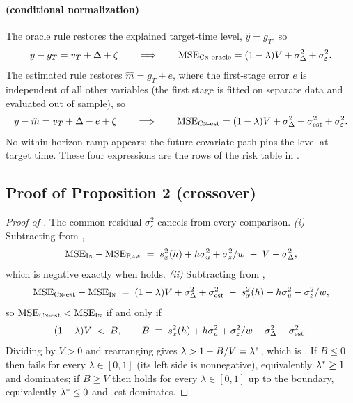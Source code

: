 \paragraph{\cnm{} (conditional normalization)}
The oracle rule restores the explained target-time level, $\hat y = g_T$, so
\begin{equation}\label{eq:app-msecnor}
  y - g_T = v_T + \Delta + \zeta
  \qquad\Longrightarrow\qquad
  \mathrm{MSE}_{\textsc{Cn}\text{-oracle}} = (1-\lambda)V + \sigma_\Delta^2 + \sigma_\varepsilon^2 .
\end{equation}
The estimated rule restores $\hat m = g_T + e$, where the first-stage error $e$ is independent of all other variables (the first stage is fitted on separate data and evaluated out of sample), so
\begin{equation}\label{eq:app-msecn}
  y - \hat m = v_T + \Delta - e + \zeta
  \qquad\Longrightarrow\qquad
  \mathrm{MSE}_{\textsc{Cn}\text{-est}} = (1-\lambda)V + \sigma_\Delta^2 + \sigma_{\mathrm{est}}^2 + \sigma_\varepsilon^2 .
\end{equation}
No within-horizon ramp appears: the future covariate path pins the level at target time. These four expressions are the rows of the risk table in .

\subsection{Proof of Proposition 2 (crossover)}\label{app:proofs:prop2}

\begin{proof}[Proof of ]
The common residual $\sigma_\varepsilon^2$ cancels from every comparison.
\emph{(i)} Subtracting  from ,
\begin{align}
  \mathrm{MSE}_{\textsc{In}} - \mathrm{MSE}_{\textsc{Raw}}
  \;=\; s_x^2(h) + h\sigma_u^2 + \sigma_z^2/w \;-\; V - \sigma_\Delta^2 ,
\end{align}
which is negative exactly when  holds.
\emph{(ii)} Subtracting  from ,
\begin{align}
  \mathrm{MSE}_{\textsc{Cn}\text{-est}} - \mathrm{MSE}_{\textsc{In}}
  \;=\; (1-\lambda)V + \sigma_\Delta^2 + \sigma_{\mathrm{est}}^2 \;-\; s_x^2(h) - h\sigma_u^2 - \sigma_z^2/w ,
\end{align}
so $\mathrm{MSE}_{\textsc{Cn}\text{-est}} < \mathrm{MSE}_{\textsc{In}}$ if and only if
\begin{equation}\label{eq:app-cross}
  (1-\lambda)V \;<\; B, \qquad
  B \;\equiv\; s_x^2(h) + h\sigma_u^2 + \sigma_z^2/w - \sigma_\Delta^2 - \sigma_{\mathrm{est}}^2 .
\end{equation}
Dividing by $V > 0$ and rearranging gives $\lambda > 1 - B/V = \lambda^{*}$, which is . If $B \le 0$ then  fails for every $\lambda \in [0,1]$ (its left side is nonnegative), equivalently $\lambda^{*} \ge 1$ and \inm{} dominates; if $B \ge V$ then  holds for every $\lambda \in [0,1]$ up to the boundary, equivalently $\lambda^{*} \le 0$ and \cnm{}-est dominates.
\end{proof}

